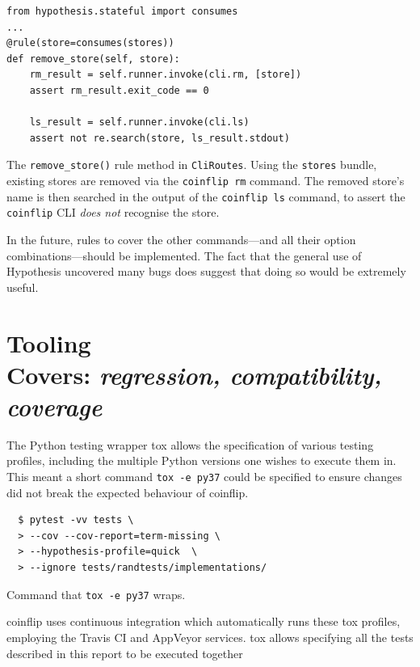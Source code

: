 \documentclass[11pt]{article}
\begin{document}
\begin{listing}[htbp]
\begin{verbatim}
from hypothesis.stateful import consumes
...
@rule(store=consumes(stores))
def remove_store(self, store):
    rm_result = self.runner.invoke(cli.rm, [store])
    assert rm_result.exit_code == 0

    ls_result = self.runner.invoke(cli.ls)
    assert not re.search(store, ls_result.stdout)
\end{verbatim}
\caption[\texttt{remove\_store()} definition in \texttt{CliRoutes}]{The \texttt{remove\_store()} rule method in \texttt{CliRoutes}. Using the \texttt{stores} bundle, existing stores are removed via the \texttt{coinflip rm} command. The removed store's name is then searched in the output of the \texttt{coinflip ls} command, to assert the \texttt{coinflip} CLI \emph{does not} recognise the store.}
\end{listing}

In the future, rules to cover the other commands---and all their option combinations---should be implemented. The fact that the general use of Hypothesis uncovered many bugs does suggest that doing so would be extremely useful.

\section[Tooling]{Tooling\\ \small{Covers: \emph{regression, compatibility, coverage}}}
\label{sec:ci}

The Python testing wrapper tox \cite{tox} allows the specification of various testing profiles, including the multiple Python versions one wishes to execute them in. This meant a short command \texttt{tox -e py37} could be specified to ensure changes did not break the expected behaviour of coinflip.

\begin{listing}[htbp]
  \begin{verbatim}
  $ pytest -vv tests \
  > --cov --cov-report=term-missing \
  > --hypothesis-profile=quick  \
  > --ignore tests/randtests/implementations/
  \end{verbatim}
  \caption{Command that \texttt{tox -e py37} wraps.}
\end{listing}

coinflip uses continuous integration which automatically runs these tox profiles, employing the Travis CI \cite{travis} and AppVeyor \cite{appveyor} services. tox allows specifying all the tests described in this report to be executed together
\end{document}
